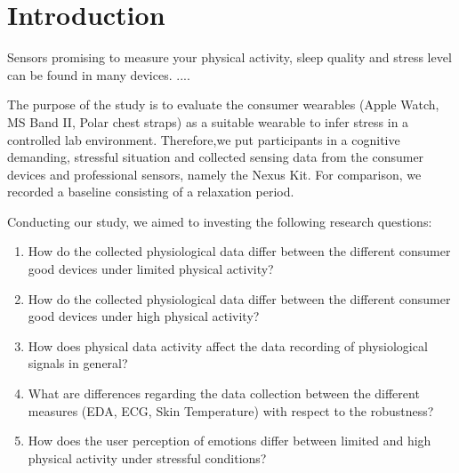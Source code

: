 \section{Introduction}

Sensors promising to measure your physical activity, sleep quality and stress level can be found in many devices. ....  





The purpose of the study is to evaluate the consumer wearables (Apple Watch, MS Band II, Polar chest straps) as a suitable wearable to infer stress in a controlled lab environment. Therefore,we put participants in a cognitive demanding, stressful situation and collected sensing data from the consumer devices and professional sensors, namely the Nexus Kit. For comparison, we recorded a baseline consisting of a relaxation period. 

Conducting our study, we aimed to investing the following research questions:
\begin{enumerate}
	\item How do the collected physiological data differ between the different consumer good devices under limited physical activity?
	\item How do the collected physiological data differ between the different consumer good devices under high physical activity?
	\item How does physical data activity affect the data recording of physiological signals in general? 
	\item What are differences regarding the data collection between the different measures (EDA, ECG, Skin Temperature) with respect to the robustness?
	\item How does the user perception of emotions differ between limited and high physical activity under stressful conditions?  
\end{enumerate}



 


